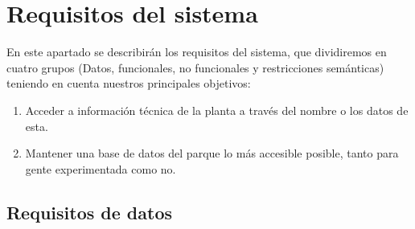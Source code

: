\documentclass[10pt,a4paper]{article}
\begin{document}
\section{\textbf{Requisitos del sistema}}

En este apartado se describirán los requisitos del sistema, que dividiremos en cuatro grupos (Datos, funcionales, no funcionales y restricciones semánticas) teniendo en cuenta nuestros principales objetivos:

\begin{enumerate}
\item Acceder a información técnica de la planta a través del nombre o los datos de esta.
\item Mantener una base de datos del parque lo más accesible posible, tanto para gente experimentada como no.
\end{enumerate}

\subsection{\textbf{Requisitos de datos}}
\end{document}
